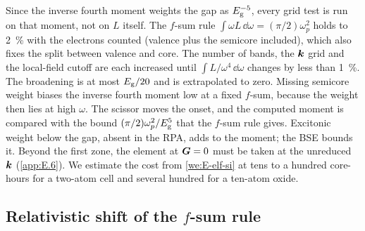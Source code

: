 Since the inverse fourth moment weights the gap as $E_{\mathrm{g}}^{-5}$, every grid test is run on that moment, not on $L$ itself. The $f$-sum rule $\int\omega L\,\dd\omega = (\pi/2)\omega_p^2$ holds to \SI{2}{\percent} with the electrons counted (valence plus the semicore included), which also fixes the split between valence and core. The number of bands, the $\bm{k}$ grid and the local-field cutoff are each increased until $\int L/\omega^4\,\dd\omega$ changes by less than \SI{1}{\percent}. The broadening is at most $E_{\mathrm{g}}/20$ and is extrapolated to zero. Missing semicore weight biases the inverse fourth moment low at a fixed $f$-sum, because the weight then lies at high $\omega$. The scissor moves the onset, and the computed moment is compared with the bound $(\pi/2)\omega_p^2/E_{\mathrm{g}}^5$ that the $f$-sum rule gives. Excitonic weight below the gap, absent in the RPA, adds to the moment; the BSE bounds it. Beyond the first zone, the element at $\bm{G} = 0$ must be taken at the unreduced $\bm{k}$ (\cref{app:E.6}). We estimate the cost from \cref{we:E-elf-si} at tens to a hundred core-hours for a two-atom cell and several hundred for a ten-atom oxide.

\subsection{Relativistic shift of the \texorpdfstring{$f$}{f}-sum rule}

